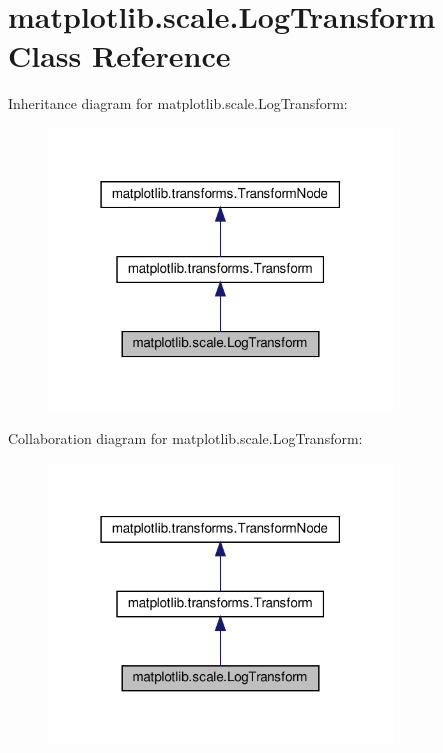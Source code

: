 \hypertarget{classmatplotlib_1_1scale_1_1LogTransform}{}\section{matplotlib.\+scale.\+Log\+Transform Class Reference}
\label{classmatplotlib_1_1scale_1_1LogTransform}


Inheritance diagram for matplotlib.\+scale.\+Log\+Transform\+:
\nopagebreak
\begin{figure}[H]
\begin{center}
\leavevmode
\includegraphics[width=259pt]{classmatplotlib_1_1scale_1_1LogTransform__inherit__graph}
\end{center}
\end{figure}


Collaboration diagram for matplotlib.\+scale.\+Log\+Transform\+:
\nopagebreak
\begin{figure}[H]
\begin{center}
\leavevmode
\includegraphics[width=259pt]{classmatplotlib_1_1scale_1_1LogTransform__coll__graph}
\end{center}
\end{figure}
